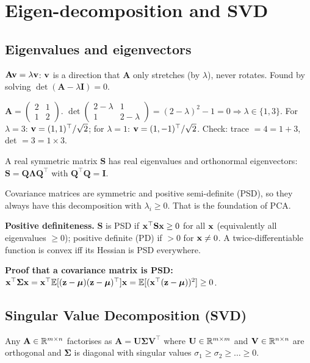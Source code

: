 \section{Eigen-decomposition and SVD}

\subsection{Eigenvalues and eigenvectors}
$\mathbf{A}\mathbf{v}=\lambda\mathbf{v}$: $\mathbf{v}$ is a direction that $\mathbf{A}$ only stretches (by $\lambda$), never rotates. Found by solving $\det(\mathbf{A}-\lambda\mathbf{I})=0$.

\begin{example}
$\mathbf{A}=\begin{pmatrix}2&1\\1&2\end{pmatrix}$. $\det\begin{pmatrix}2-\lambda&1\\1&2-\lambda\end{pmatrix}=(2-\lambda)^2-1=0\Rightarrow\lambda\in\{1,3\}$. For $\lambda=3$: $\mathbf{v}=(1,1)^\top/\sqrt2$; for $\lambda=1$: $\mathbf{v}=(1,-1)^\top/\sqrt2$. Check: trace $=4=1+3$, det $=3=1\times3$.
\end{example}

\begin{theorem}
A real symmetric matrix $\mathbf{S}$ has real eigenvalues and orthonormal eigenvectors: $\mathbf{S}=\mathbf{Q}\bm{\Lambda}\mathbf{Q}^\top$ with $\mathbf{Q}^\top\mathbf{Q}=\mathbf{I}$.
\end{theorem}
Covariance matrices are symmetric and positive semi-definite (PSD), so they always have this decomposition with $\lambda_i\ge0$. That is the foundation of PCA.

\textbf{Positive definiteness.} $\mathbf{S}$ is PSD if $\mathbf{x}^\top\mathbf{S}\mathbf{x}\ge0$ for all $\mathbf{x}$ (equivalently all eigenvalues $\ge0$); positive definite (PD) if $>0$ for $\mathbf{x}\neq0$. A twice-differentiable function is convex iff its Hessian is PSD everywhere.

\textbf{Proof that a covariance matrix is PSD:} $\mathbf{x}^\top\bm{\Sigma}\mathbf{x}=\mathbf{x}^\top\mathbb{E}[(\mathbf{z}-\bm{\mu})(\mathbf{z}-\bm{\mu})^\top]\mathbf{x}=\mathbb{E}[(\mathbf{x}^\top(\mathbf{z}-\bm{\mu}))^2]\ge0$.

\subsection{Singular Value Decomposition (SVD)}
Any $\mathbf{A}\in\mathbb{R}^{m\times n}$ factorises as $\mathbf{A}=\mathbf{U}\bm{\Sigma}\mathbf{V}^\top$ where $\mathbf{U}\in\mathbb{R}^{m\times m}$ and $\mathbf{V}\in\mathbb{R}^{n\times n}$ are orthogonal and $\bm\Sigma$ is diagonal with singular values $\sigma_1\ge\sigma_2\ge\dots\ge0$.

